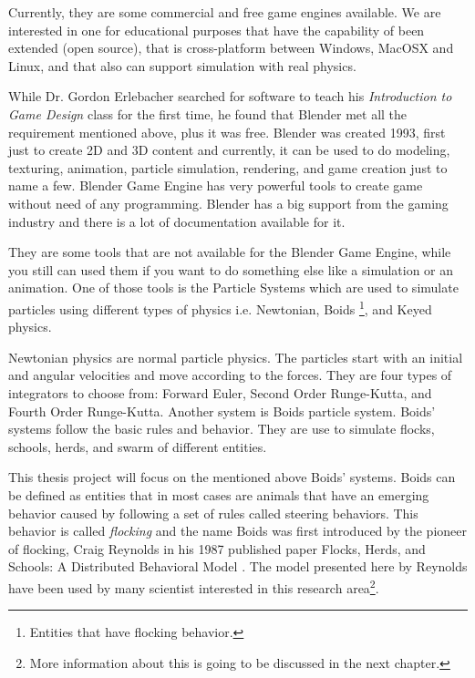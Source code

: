 
Currently, they are some commercial and free game engines available. We are interested in one for educational purposes that have the capability of been extended (open source), that is cross-platform between Windows, MacOSX and Linux, and that also can support simulation with real physics. 


While Dr. Gordon Erlebacher searched for software to teach his \textit{Introduction to Game Design} class for the first time, he found that Blender \cite{blenderWeb} met all the requirement mentioned above, plus it was free. Blender was created 1993, first just to create 2D and 3D content and currently, it can be used to do modeling, texturing, animation, particle simulation, rendering, and game creation just to name a few. Blender Game Engine has very powerful tools to create game without need of any programming. Blender has a big support from the gaming industry and there is a lot of documentation available for it.  


They are some tools that are not available for the Blender Game Engine, while you still can used them if you want to do something else like a simulation or an animation. One of those tools is the Particle Systems which are used to simulate particles using different types of physics i.e. Newtonian, Boids \footnote{Entities that have flocking behavior.}, and Keyed physics. 



Newtonian physics are normal particle physics. The particles start with an initial and angular velocities and move according to the forces. They are four types of integrators to choose from: Forward Euler, Second Order Runge-Kutta, and Fourth Order Runge-Kutta. Another system is Boids particle system. Boids' systems follow the basic rules and behavior. They are use to simulate flocks, schools, herds, and swarm of different entities.

This thesis project will focus on the mentioned above Boids' systems. Boids can be defined as entities that in most cases are animals that have an emerging behavior caused by following a set of rules called steering behaviors. This behavior is called \textit{flocking} and the name Boids was first introduced by the pioneer of flocking, Craig Reynolds in his 1987 published paper Flocks, Herds, and Schools: A Distributed Behavioral Model \cite{craig1}. The model presented here by Reynolds have been used by many scientist interested in this research area\footnote{More information about this is going to be discussed in the next chapter.}.

